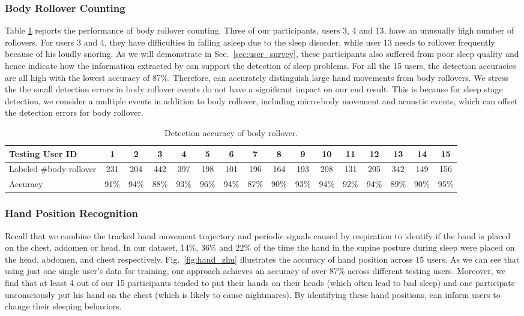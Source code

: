 \subsubsection{Body Rollover Counting}
Table \ref{tab:rollver} reports the performance of body rollover counting. Three of our participants, users 3, 4 and 13, have an unusually
high number of rollovers. For users 3 and 4, they have difficulties in falling asleep due to the sleep disorder, while user 13 needs to
rollover frequently because of his loudly snoring. As we will demonstrate in Sec.~\ref{sec:user_survey}, these participants also suffered
from poor sleep quality and hence indicate how the information extracted by {\systemname} can support the detection of sleep problems. For
all the 15 users, the detection accuracies are all high with the lowest accuracy of 87\%. Therefore, {\systemname} can accurately
distinguish  large hand movements from body rollovers. We stress the the small detection errors in body rollover events do not have a
significant impact on our end result. This is because for sleep stage detection, we consider a multiple events in addition to body
rollover, including micro-body movement and acoustic events, which can offset the detection errors for body rollover.

\begin{table}[!t]\footnotesize
  \caption{Detection accuracy of body rollover.}\label{tab:rollver}
  \setlength{\tabcolsep}{3pt}
\renewcommand{\arraystretch}{0.67}{\multirowsetup}{\centering}
        \begin{tabular}{lccccccccccccccc}
        \toprule
         \textbf{Testing User ID}    & 1& 2  & 3& 4& 5& 6& 7& 8& 9& 10& 11& 12& 13& 14& 15\\
        \midrule
            \rowcolor{Gray} {Labeled \#body-rollover}  &231&204&442&397&198&101&196&164&193&208&131&205&342&149&156 \\
                 {Accuracy} &91\%& 94\% &88\%&93\%&96\%&94\%&87\%&90\% &93\% &94\% &92\% &94\% &89\% &90\% &95\%\\
        \bottomrule
 \end{tabular}
\end{table}

\subsubsection{Hand Position Recognition}
Recall that we combine the tracked hand movement trajectory and periodic signals caused by respiration to identify if the hand is placed on
the chest, addomen or head. In our dataset, 14\%, 36\% and 22\% of the time the hand in the supine posture during sleep were placed on the
head, abdomen, and chest respectively. Fig.~\ref{fig:hand_zhu} illustrates the accuracy of hand position across 15 users. As we can see
that using just one single user's data for training, our approach achieves an accuracy of over 87\% across different testing users.
Moreover, we find that at least 4 out of our 15 participants tended to put their hands on their heads (which often lead to bad sleep) and
one participate unconsciously put his hand on the chest (which is likely to cause nightmares). By identifying these hand positions,
\systemname can inform users to change their sleeping behaviors.


